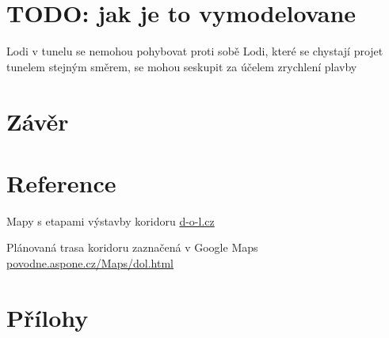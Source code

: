 \documentclass[11pt,a4paper]{article}
\begin{document}
  \section{TODO: jak je to vymodelovane}

    Lodi v tunelu se nemohou pohybovat proti sobě
    Lodi, které se chystají projet tunelem stejným směrem, se mohou seskupit za účelem zrychlení plavby

  \section{Závěr}

  \section{Reference}

    \begin{enumerate}[label={[\arabic*]}]
      \item Mapy s etapami výstavby koridoru 
        \href{http://d-o-l.cz/index.php/cs/kestazeni/category/14}
             {d-o-l.cz}
      \item Plánovaná trasa koridoru zaznačená v Google Maps
        \href{http://povode.aspone.cz/Maps/dol.html}
             {povodne.aspone.cz/Maps/dol.html}
    \end{enumerate}

  \appendix
    \newpage

  \section{Přílohy}
\end{document}

